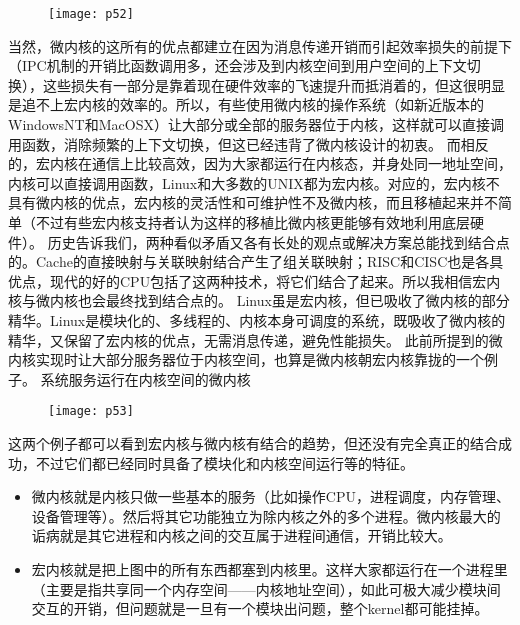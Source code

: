 \documentclass[utf8]{book}
\begin{document}
	\begin{figure}[H]
	\centering
	\texttt{[image: p52]}
	\end{figure}

当然，微内核的这所有的优点都建立在因为消息传递开销而引起效率损失的前提下（IPC机制的开销比函数调用多，还会涉及到内核空间到用户空间的上下文切换），这些损失有一部分是靠着现在硬件效率的飞速提升而抵消着的，但这很明显是追不上宏内核的效率的。所以，有些使用微内核的操作系统（如新近版本的WindowsNT和MacOSX）让大部分或全部的服务器位于内核，这样就可以直接调用函数，消除频繁的上下文切换，但这已经违背了微内核设计的初衷。
而相反的，宏内核在通信上比较高效，因为大家都运行在内核态，并身处同一地址空间，内核可以直接调用函数，Linux和大多数的UNIX都为宏内核。对应的，宏内核不具有微内核的优点，宏内核的灵活性和可维护性不及微内核，而且移植起来并不简单（不过有些宏内核支持者认为这样的移植比微内核更能够有效地利用底层硬件）。
历史告诉我们，两种看似矛盾又各有长处的观点或解决方案总能找到结合点的。Cache的直接映射与关联映射结合产生了组关联映射；RISC和CISC也是各具优点，现代的好的CPU包括了这两种技术，将它们结合了起来。所以我相信宏内核与微内核也会最终找到结合点的。
Linux虽是宏内核，但已吸收了微内核的部分精华。Linux是模块化的、多线程的、内核本身可调度的系统，既吸收了微内核的精华，又保留了宏内核的优点，无需消息传递，避免性能损失。
此前所提到的微内核实现时让大部分服务器位于内核空间，也算是微内核朝宏内核靠拢的一个例子。
系统服务运行在内核空间的微内核

	\begin{figure}[H]
	\centering
	\texttt{[image: p53]}
	\end{figure}

这两个例子都可以看到宏内核与微内核有结合的趋势，但还没有完全真正的结合成功，不过它们都已经同时具备了模块化和内核空间运行等的特征。

\begin{itemize}
	\item 微内核就是内核只做一些基本的服务（比如操作CPU，进程调度，内存管理、设备管理等）。然后将其它功能独立为除内核之外的多个进程。微内核最大的诟病就是其它进程和内核之间的交互属于进程间通信，开销比较大。
	\item 宏内核就是把上图中的所有东西都塞到内核里。这样大家都运行在一个进程里（主要是指共享同一个内存空间——内核地址空间），如此可极大减少模块间交互的开销，但问题就是一旦有一个模块出问题，整个kernel都可能挂掉。
\end{itemize}
\end{document}
